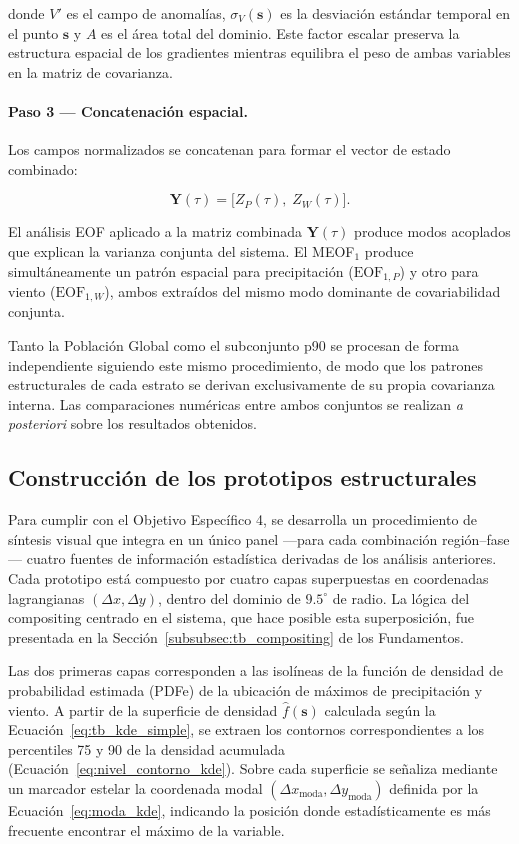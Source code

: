 donde $V'$ es el campo de anomalías, $\sigma_{V}(\mathbf{s})$ es la desviación estándar temporal en el punto $\mathbf{s}$ y $A$ es el área total del dominio. Este factor escalar preserva la estructura espacial de los gradientes mientras equilibra el peso de ambas variables en la matriz de covarianza.

\paragraph{Paso 3 — Concatenación espacial.} Los campos normalizados se concatenan para formar el vector de estado combinado:

\begin{equation}\label{eq:meof_vector}
    \mathbf{Y}(\tau) = \big[ Z_P(\tau),\; Z_W(\tau) \big].
\end{equation}

El análisis EOF aplicado a la matriz combinada $\mathbf{Y}(\tau)$ produce modos acoplados que explican la varianza conjunta del sistema. El MEOF$_1$ produce simultáneamente un patrón espacial para precipitación ($\text{EOF}_{1,P}$) y otro para viento ($\text{EOF}_{1,W}$), ambos extraídos del mismo modo dominante de covariabilidad conjunta.

Tanto la Población Global como el subconjunto p90 se procesan de forma independiente siguiendo este mismo procedimiento, de modo que los patrones estructurales de cada estrato se derivan exclusivamente de su propia covarianza interna. Las comparaciones numéricas entre ambos conjuntos se realizan \textit{a posteriori} sobre los resultados obtenidos.

\subsection{Construcción de los prototipos estructurales}\label{subsec:prototipos}
Para cumplir con el Objetivo Específico 4, se desarrolla un procedimiento de síntesis visual que integra en un único panel ---para cada combinación región--fase--- cuatro fuentes de información estadística derivadas de los análisis anteriores. Cada prototipo está compuesto por cuatro capas superpuestas en coordenadas lagrangianas $(\Delta x, \Delta y)$, dentro del dominio de $9.5^{\circ}$ de radio. La lógica del compositing centrado en el sistema, que hace posible esta superposición, fue presentada en la Sección~\ref{subsubsec:tb_compositing} de los Fundamentos.

Las dos primeras capas corresponden a las isolíneas de la función de densidad de probabilidad estimada (PDFe) de la ubicación de máximos de precipitación y viento. A partir de la superficie de densidad $\hat{f}(\mathbf{s})$ calculada según la Ecuación~\ref{eq:tb_kde_simple}, se extraen los contornos correspondientes a los percentiles 75 y 90 de la densidad acumulada (Ecuación~\ref{eq:nivel_contorno_kde}). Sobre cada superficie se señaliza mediante un marcador estelar la coordenada modal $(\Delta x_{\text{moda}}, \Delta y_{\text{moda}})$ definida por la Ecuación~\ref{eq:moda_kde}, indicando la posición donde estadísticamente es más frecuente encontrar el máximo de la variable.

